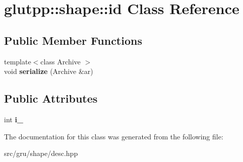 \hypertarget{classglutpp_1_1shape_1_1id}{\section{glutpp\-:\-:shape\-:\-:id \-Class \-Reference}
\label{classglutpp_1_1shape_1_1id}
}
\subsection*{\-Public \-Member \-Functions}
\begin{DoxyCompactItemize}
\item 
\hypertarget{classglutpp_1_1shape_1_1id_a59d4949a2d6d84aecab374339c37e55a}{{\footnotesize template$<$class Archive $>$ }\\void {\bfseries serialize} (\-Archive \&ar)}\label{classglutpp_1_1shape_1_1id_a59d4949a2d6d84aecab374339c37e55a}

\end{DoxyCompactItemize}
\subsection*{\-Public \-Attributes}
\begin{DoxyCompactItemize}
\item 
\hypertarget{classglutpp_1_1shape_1_1id_a0831e8c6a4d3ef60f06b28e36a7bf27a}{int {\bfseries i\-\_\-}}\label{classglutpp_1_1shape_1_1id_a0831e8c6a4d3ef60f06b28e36a7bf27a}

\end{DoxyCompactItemize}


\-The documentation for this class was generated from the following file\-:\begin{DoxyCompactItemize}
\item 
src/gru/shape/desc.\-hpp\end{DoxyCompactItemize}
